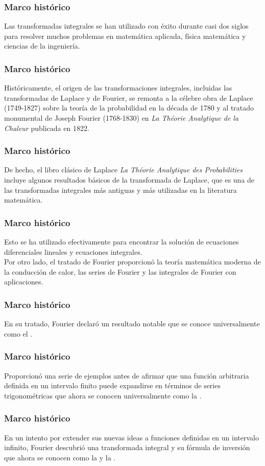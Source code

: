\documentclass[12pt]{beamer}
\begin{document}
\begin{frame}
\frametitle{Marco histórico}
Las transformadas integrales se han utilizado con éxito durante casi dos siglos para resolver muchos problemas en matemática aplicada, física matemática y ciencias de la ingeniería.
\end{frame}
\begin{frame}
\frametitle{Marco histórico}
Históricamente, el origen de las transformaciones integrales, incluidas las transformadas de Laplace y de Fourier, \pause se remonta a la célebre obra de Laplace (1749-1827) sobre la teoría de la probabilidad en la década de 1780 \pause y al tratado monumental de Joseph Fourier (1768-1830) en \emph{La Théorie Analytique de la Chaleur} publicada en 1822.
\end{frame}
\begin{frame}
\frametitle{Marco histórico}
De hecho, el libro clásico de Laplace \emph{La Théorie Analytique des Probabilities} incluye algunos resultados básicos de la transformada de Laplace, \pause que es una de las transformadas integrales más antiguas y más utilizadas en la literatura matemática. 
\end{frame}
\begin{frame}
\frametitle{Marco histórico}
Esto se ha utilizado efectivamente para encontrar la solución de ecuaciones diferenciales lineales y ecuaciones integrales.
\\
\bigskip
\pause
Por otro lado, el tratado de Fourier proporcionó la teoría matemática moderna de la conducción de calor, las series de Fourier y las integrales de Fourier con aplicaciones.
\end{frame}
\begin{frame}
\frametitle{Marco histórico}
En su tratado, Fourier declaró un resultado notable que se conoce universalmente como el .
\end{frame}
\begin{frame}
\frametitle{Marco histórico}
Proporcionó una serie de ejemplos antes de afirmar que una función arbitraria definida en un intervalo finito puede expandirse en términos de series trigonométricas que ahora se conocen universalmente como la .
\end{frame}
\begin{frame}
\frametitle{Marco histórico}
En un intento por extender sus nuevas ideas a funciones definidas en un intervalo infinito, \pause Fourier descubrió una transformada integral y su fórmula de inversión que ahora se conocen como la  y la .
\end{frame}
\end{document}
